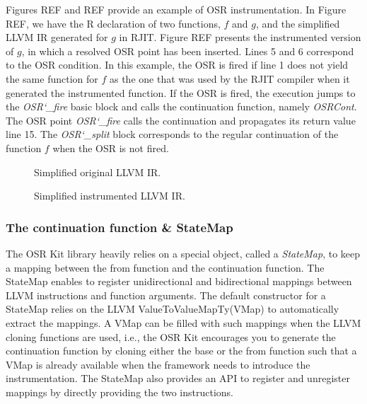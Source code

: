 Figures REF and REF provide an example of OSR instrumentation.
In Figure REF, we have the R declaration of two functions, $f$ and $g$, and the simplified LLVM IR generated for $g$ in RJIT.
Figure REF presents the instrumented version of $g$, in which a resolved OSR point has been inserted.
Lines 5 and 6 correspond to the OSR condition.
In this example, the OSR is fired if line 1 does not yield the same function for $f$ as the one that was used by the RJIT compiler when it generated the instrumented function.
If the OSR is fired, the execution jumps to the \textit{OSR\char`_fire} basic block and calls the continuation function, namely \textit{OSRCont}.
The OSR point \textit{OSR\char`_fire} calls the continuation and propagates its return value line 15.
The \textit{OSR\char`_split} block corresponds to the regular continuation of the function $f$ when the OSR is not fired.\\

\begin{figure}[h]
\caption{Simplified original LLVM IR.}
\end{figure}

\begin{figure}[h]
\caption{Simplified instrumented LLVM IR.}
\end{figure}

\subsubsection{The continuation function \& StateMap}

The OSR Kit library heavily relies on a special object, called a \textit{StateMap}, to keep a mapping between the from function and the continuation function.
The StateMap enables to register unidirectional and bidirectional mappings between LLVM instructions and function arguments.
The default constructor for a StateMap relies on the LLVM ValueToValueMapTy\cite{VMap}(VMap) to automatically extract the mappings.
A VMap can be filled with such mappings when the LLVM cloning functions are used, i.e., the OSR Kit encourages you to generate the continuation function by cloning either the base or the from function such that a VMap is already available when the framework needs to introduce the instrumentation.
The StateMap also provides an API to register and unregister mappings by directly providing the two instructions.\\

